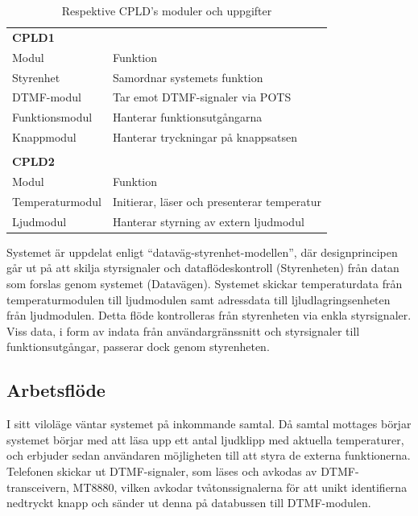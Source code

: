 \documentclass[a4paper,11pt]{article}
\begin{document}
	\begin{table} [H]
		
		\caption{Respektive CPLD's moduler och uppgifter} 
		\label{tab:uppdelningstabell}
	\begin{tabular}{l l}
		
		{\bf CPLD1} \\
		Modul	& Funktion	\\
		\hline
		Styrenhet	& Samordnar systemets funktion \\
		DTMF-modul & Tar emot DTMF-signaler via POTS \\
		Funktionsmodul	& Hanterar funktionsutgångarna \\
		Knappmodul	& Hanterar tryckningar på knappsatsen \\
		\\
		{\bf CPLD2} \\
		Modul	& Funktion	\\
		\hline
		Temperaturmodul	& Initierar, läser och presenterar temperatur \\
		Ljudmodul	& Hanterar styrning av extern ljudmodul \\
		
	\end{tabular}
	\end{table}
	
	Systemet är uppdelat enligt ``dataväg-styrenhet-modellen'', där designprincipen går ut på att skilja styrsignaler
	och dataflödeskontroll (Styrenheten) från datan som forslas genom systemet (Datavägen). Systemet skickar temperaturdata från temperaturmodulen till ljudmodulen samt adressdata till ljludlagringsenheten från ljudmodulen. Detta flöde kontrolleras från styrenheten via
	enkla styrsignaler. Viss data, i form av indata från användargränssnitt och styrsignaler till funktionsutgångar, passerar dock genom styrenheten.

	\subsection{Arbetsflöde}

I sitt viloläge väntar systemet på inkommande samtal. Då samtal mottages börjar systemet börjar med att läsa upp ett antal ljudklipp med aktuella temperaturer, och erbjuder sedan användaren möjligheten till att styra de externa funktionerna. Telefonen skickar ut DTMF-signaler, som läses och avkodas av DTMF-transceivern, MT8880, vilken avkodar tvåtonssignalerna för att unikt identifierna nedtryckt knapp och sänder ut denna på databussen till DTMF-modulen. 
\end{document}
